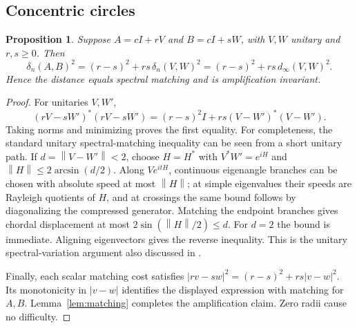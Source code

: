 \documentclass[11pt]{article}
\newtheorem{proposition}[theorem]{Proposition}
\theoremstyle{definition}\newtheorem{definition}[theorem]{Definition}
\theoremstyle{remark}\newtheorem{remark}[theorem]{Remark}
\newcommand{\norm}[1]{\left\lVert#1\right\rVert}
\newcommand{\dd}{\delta}
\newcommand{\dm}{d_\infty}
\begin{document}
\subsection{Concentric circles}
\begin{proposition}\label{prop:circles}
Suppose $A=cI+rV$ and $B=cI+sW$, with $V,W$ unitary and $r,s\ge0$. Then
\[
 \dd_n(A,B)^2=(r-s)^2+rs\,\dd_n(V,W)^2
            =(r-s)^2+rs\,\dm(V,W)^2.
\]
Hence the distance equals spectral matching and is amplification invariant.
\end{proposition}
\begin{proof}
For unitaries $V,W'$,
\[
 (rV-sW')^*(rV-sW')=(r-s)^2I+rs(V-W')^*(V-W').
\]
Taking norms and minimizing proves the first equality. For completeness, the standard unitary spectral-matching inequality can be seen from a short unitary path. If $d=\norm{V-W'}<2$, choose $H=H^*$ with $V^*W'=e^{iH}$ and $\norm H\le2\arcsin(d/2)$. Along $Ve^{itH}$, continuous eigenangle branches can be chosen with absolute speed at most $\norm H$; at simple eigenvalues their speeds are Rayleigh quotients of $H$, and at crossings the same bound follows by diagonalizing the compressed generator. Matching the endpoint branches gives chordal displacement at most $2\sin(\norm H/2)\le d$. For $d=2$ the bound is immediate. Aligning eigenvectors gives the reverse inequality. This is the unitary spectral-variation argument also discussed in \cite{bhatia}.

Finally, each scalar matching cost satisfies $|rv-sw|^2=(r-s)^2+rs|v-w|^2$. Its monotonicity in $|v-w|$ identifies the displayed expression with matching for $A,B$. Lemma~\ref{lem:matching} completes the amplification claim. Zero radii cause no difficulty.
\end{proof}
\end{document}
